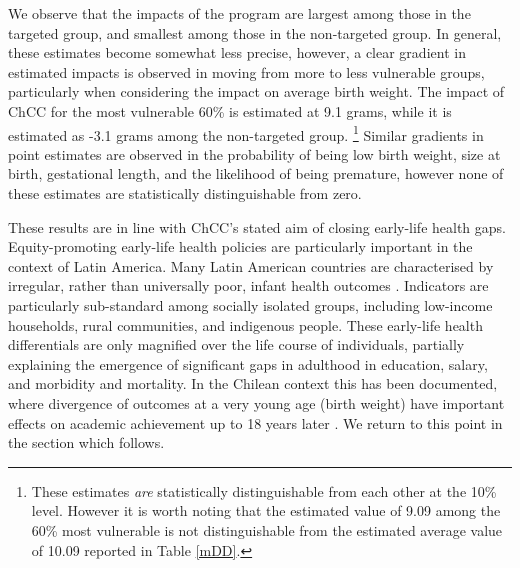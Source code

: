 \documentclass[12pt]{article}
\begin{document}
\begin{spacing}{1.4}
We observe that the impacts of the program are largest among
those in the targeted group, and smallest among those in the
non-targeted group.  In general, these estimates become somewhat
less precise, however, a clear gradient in estimated impacts is
observed in moving from more to less vulnerable groups, particularly
when considering the impact on average birth weight. The impact of
ChCC for the most vulnerable 60\% is estimated at 9.1 grams, while
it is estimated as -3.1 grams among the non-targeted group.%
\footnote{These estimates \emph{are} statistically distinguishable
  from each other at the 10\% level.  However it is worth noting
  that the estimated value of 9.09 among the 60\% most vulnerable
  is not distinguishable from the estimated average value of 10.09
  reported in Table \ref{mDD}.}
Similar gradients in point estimates are observed in the
probability of being low birth weight, size at birth, gestational
length, and the likelihood of being premature, however none of
these estimates are statistically distinguishable from zero.

These results are in line with ChCC's stated aim of closing early-life
health gaps. Equity-promoting early-life health policies are
particularly important in the context of Latin America. Many Latin
American countries are characterised by irregular, rather than universally
poor, infant health outcomes \citep{Belizanetal2007}.  Indicators
are particularly sub-standard among socially isolated groups, including
low-income households, rural communities, and indigenous people.  These
early-life health differentials are only magnified over the life course of
individuals, partially explaining the emergence of significant gaps in
adulthood in education, salary, and morbidity and mortality. In the
Chilean context this has been documented, where divergence of outcomes at
a very young age (birth weight) have important effects on academic
achievement up to 18 years later \citep{Bharadwajetal2017}.  We return to
this point in the section which follows.


\end{spacing}
\end{document}
